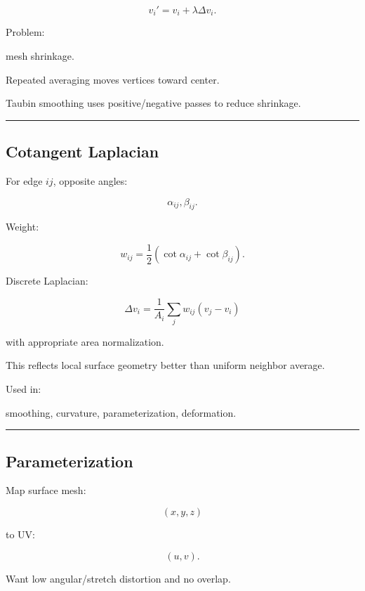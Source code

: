 \[
\boxed{
v_i'
=
v_i+
\lambda\Delta v_i.
}
\]

Problem:

mesh shrinkage.

Repeated averaging moves vertices toward center.

Taubin smoothing uses positive/negative passes to reduce shrinkage.

\begin{center}\rule{0.5\linewidth}{0.5pt}\end{center}

\subsection{Cotangent Laplacian}\label{04-visual-computing-ii-ch041-cotangent-laplacian}

\hypertarget{04-visual-computing-ii-ch041-cotangent-laplacian}{}

For edge \(ij\), opposite angles:

\[
\alpha_{ij},\beta_{ij}.
\]

Weight:

\[
\boxed{
w_{ij}
=
\frac12
(
\cot\alpha_{ij}
+
\cot\beta_{ij}
).
}
\]

Discrete Laplacian:

\[
\Delta v_i
=
\frac1{A_i}
\sum_{j}
w_{ij}(v_j-v_i)
\]

with appropriate area normalization.

This reflects local surface geometry better than uniform neighbor average.

Used in:

smoothing, curvature, parameterization, deformation.

\begin{center}\rule{0.5\linewidth}{0.5pt}\end{center}

\subsection{Parameterization}\label{04-visual-computing-ii-ch041-parameterization}

\hypertarget{04-visual-computing-ii-ch041-parameterization}{}

Map surface mesh:

\[
(x,y,z)
\]

to UV:

\[
(u,v).
\]

Want low angular/stretch distortion and no overlap.

